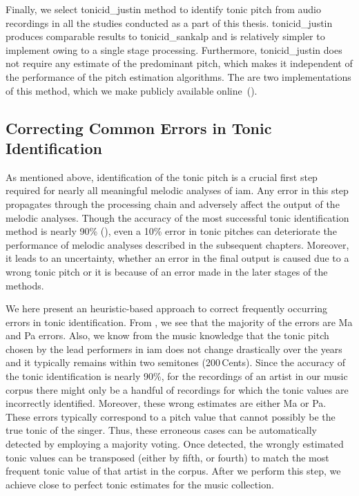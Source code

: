 {Finally, we select \acrshort{tonicid_justin} method to identify tonic pitch from audio recordings in all the studies conducted as a part of this thesis. \acrshort{tonicid_justin} produces comparable results to \acrshort{tonicid_sankalp} and is relatively simpler to implement owing to a single stage processing. Furthermore, \acrshort{tonicid_justin} does not require any estimate of the predominant pitch, which makes it independent of the performance of the pitch estimation algorithms. The are two implementations of this method, which we make publicly available online~().


\subsection{Correcting Common Errors in Tonic Identification}
\label{sec:pre_processing_tonic_identification_correcting_errors}

As mentioned above, identification of the tonic pitch is a crucial first step required for nearly all meaningful melodic analyses of \gls{iam}. Any error in this step propagates through the processing chain and adversely affect the output of the melodic analyses. Though the accuracy of the most successful tonic identification method is nearly 90\% (), even a 10\% error in tonic pitches can deteriorate the performance of melodic analyses described in the subsequent chapters. Moreover, it leads to an uncertainty, whether an error in the final output is caused due to a wrong tonic pitch or it is because of an error made in the later stages of the methods. 

We here present an heuristic-based approach to correct frequently occurring errors in tonic identification. From , we see that the majority of the errors are Ma and Pa errors. Also, we know from the music knowledge that the tonic pitch chosen by the lead performers in \gls{iam} does not change drastically over the years and it typically remains within two semitones (200\,Cents). Since the accuracy of the tonic identification is nearly 90\%, for the recordings of an artist in our music corpus there might only be a handful of recordings for which the tonic values are incorrectly identified. Moreover, these wrong estimates are either Ma or Pa. These errors typically correspond to a pitch value that cannot possibly be the true tonic of the singer. Thus, these erroneous cases can be automatically detected by employing a majority voting. Once detected, the wrongly estimated tonic values can be transposed (either by fifth, or fourth) to match the most frequent tonic value of that artist in the corpus. After we perform this step, we achieve close to perfect tonic estimates for the music collection. %


}
